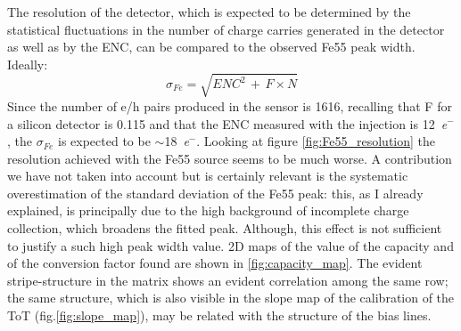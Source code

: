         The resolution of the detector, which is expected to be determined by the statistical fluctuations in the number of charge carries generated in the detector as well as by the ENC, can be compared to the observed Fe55 peak width. Ideally:
        \begin{equation}
            \sigma_{Fe} = \sqrt{ENC^2 \,+ \,F \times N}
        \end{equation}
        Since the number of e/h pairs produced in the sensor is 1616, recalling that F for a silicon detector is 0.115 and that the ENC measured with the injection is \SI{12}{\elementarycharge}$^-$, the $\sigma_{Fe}$ is expected to be $\sim$\SI{18}{\elementarycharge}$^-$. Looking at figure \ref{fig:Fe55_resolution} the resolution achieved with the Fe55 source seems to be much worse. A contribution we have not taken into account but is certainly relevant is the systematic overestimation of the standard deviation of the Fe55 peak: this, as I already explained, is principally due to the high background of incomplete charge collection, which broadens the fitted peak. Although, this effect is not sufficient to justify a such high peak width value. 
        2D maps of the value of the capacity and of the conversion factor found are shown in \ref{fig:capacity_map}. The evident stripe-structure in the matrix shows an evident correlation among the same row; the same structure, which is also visible in the slope map of the calibration of the ToT (fig.\ref{fig:slope_map}), may be related with the structure of the bias lines.\\
